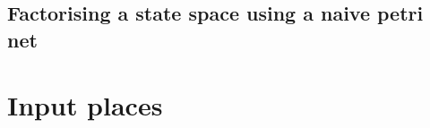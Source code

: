 \documentclass[a4paper]{article}
\begin{document}
\subsection{Factorising a state space using a naive petri net}
\section{Input places}
\end{document}
